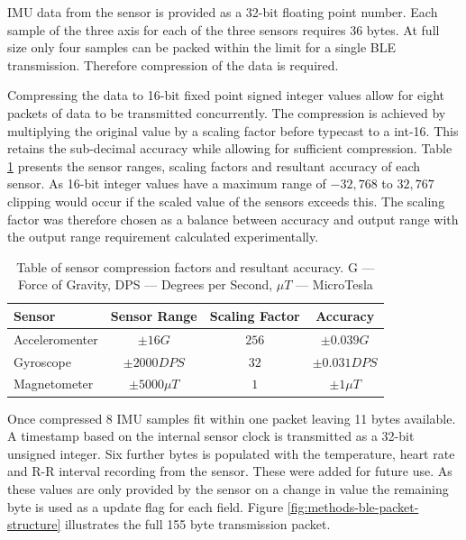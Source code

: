 IMU data from the sensor is provided as a 32-bit floating point number. Each sample of the three axis for each of the three sensors requires 36 bytes. At full size only four samples can be packed within the limit for a single BLE transmission. Therefore compression of the data is required.

Compressing the data to 16-bit fixed point signed integer values allow for eight packets of data to be transmitted concurrently. The compression is achieved by multiplying the original value by a scaling factor before typecast to a int-16. This retains the sub-decimal accuracy while allowing for sufficient compression. Table \ref{tab:methods-imu-data-compression-factors} presents the sensor ranges, scaling factors and resultant accuracy of each sensor. As 16-bit integer values have a maximum range of $-32,768$ to $32,767$ clipping would occur if the scaled value of the sensors exceeds this. The scaling factor was therefore chosen as a balance between accuracy and output range with the output range requirement calculated experimentally.

\begin{table}[!hbt]
    \centering
    \caption{Table of sensor compression factors and resultant accuracy. G --- Force of Gravity, DPS --- Degrees per Second, $\mu T$ --- MicroTesla}
    \label{tab:methods-imu-data-compression-factors}
    
    \begin{tabular}{l|ccc}
         \textbf{Sensor} & \textbf{Sensor Range} & \textbf{Scaling Factor} & \textbf{Accuracy} \\
         \hline
         Acceleromenter & $\pm16 G$ & $256$ & $\pm0.039 G$  \\
         Gyroscope & $\pm2000 DPS$ & $32$ & $\pm0.031 DPS$  \\
         Magnetometer & $\pm5000\mu T$ & $1$ & $\pm1\mu T$
    \end{tabular}
\end{table}

Once compressed 8 IMU samples fit within one packet leaving 11 bytes available. A timestamp based on the internal sensor clock is transmitted as a 32-bit unsigned integer. Six further bytes is populated with the temperature, heart rate and R-R interval recording from the sensor. These were added for future use. As these values are only provided by the sensor on a change in value the remaining byte is used as a update flag for each field. Figure \ref{fig:methods-ble-packet-structure} illustrates the full 155 byte transmission packet.

